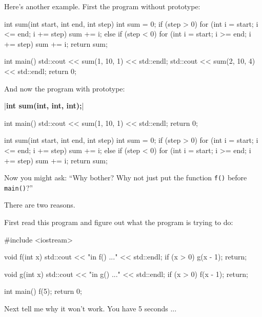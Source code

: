 Here's another example. First the program without prototype:

\begin{consolethree}[escapeinside=||]
int sum(int start, int end, int step)
{
    int sum = 0;
    if (step > 0)
    {
        for (int i = start; i <= end; i += step)
        {
            sum += i;
        }
    }
    else if (step < 0)
    {
        for (int i = start; i >= end; i += step)
        {
            sum += i;
        }
    }
    return sum;
}

int main()
{
    std::cout << sum(1, 10, 1) << std::endl;
    std::cout << sum(2, 10, 4) << std::endl;
    return 0;
}
\end{consolethree}

And now the program with prototype:

\begin{consolethree}[escapeinside=||]
|\textbf{int sum(int, int, int);}|

int main()
{
    std::cout << sum(1, 10, 1) << std::endl;
    return 0;
}

int sum(int start, int end, int step)
{
    int sum = 0;
    if (step > 0)
    {
        for (int i = start; i <= end; i += step)
        {
            sum += i;
        }
    }
    else if (step < 0)
    {
        for (int i = start; i >= end; i += step)
        {
            sum += i;
        }
    }
    return sum;
}
\end{consolethree}




Now you might ask: ``Why bother? Why not just put the function
\texttt{f()} before \texttt{main()}?''

There are two reasons.

First read this program and figure out what the program is trying to do:

\begin{consolethree}[escapeinside=||]
#include <iostream>

void f(int x)
{
    std::cout << "in f() ..." << std::endl;
    if (x > 0) g(x - 1);
    return;
}

void g(int x)
{
    std::cout << "in g() ..." << std::endl;
    if (x > 0) f(x - 1);
    return;
}

int main()
{
    f(5);
    return 0;
}
\end{consolethree}

Next tell me why it won't work. You have 5 seconds ...


